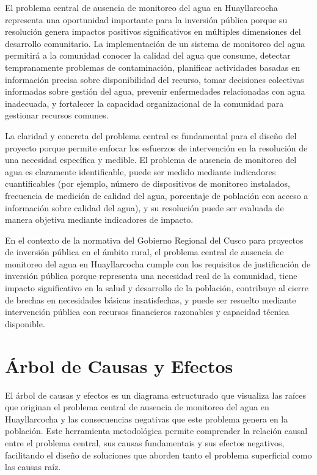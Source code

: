 El problema central de ausencia de monitoreo del agua en Huayllarcocha representa una oportunidad importante para la inversión pública porque su resolución genera impactos positivos significativos en múltiples dimensiones del desarrollo comunitario. La implementación de un sistema de monitoreo del agua permitirá a la comunidad conocer la calidad del agua que consume, detectar tempranamente problemas de contaminación, planificar actividades basadas en información precisa sobre disponibilidad del recurso, tomar decisiones colectivas informadas sobre gestión del agua, prevenir enfermedades relacionadas con agua inadecuada, y fortalecer la capacidad organizacional de la comunidad para gestionar recursos comunes.

La claridad y concreta del problema central es fundamental para el diseño del proyecto porque permite enfocar los esfuerzos de intervención en la resolución de una necesidad específica y medible. El problema de ausencia de monitoreo del agua es claramente identificable, puede ser medido mediante indicadores cuantificables (por ejemplo, número de dispositivos de monitoreo instalados, frecuencia de medición de calidad del agua, porcentaje de población con acceso a información sobre calidad del agua), y su resolución puede ser evaluada de manera objetiva mediante indicadores de impacto.

En el contexto de la normativa del Gobierno Regional del Cusco para proyectos de inversión pública en el ámbito rural, el problema central de ausencia de monitoreo del agua en Huayllarcocha cumple con los requisitos de justificación de inversión pública porque representa una necesidad real de la comunidad, tiene impacto significativo en la salud y desarrollo de la población, contribuye al cierre de brechas en necesidades básicas insatisfechas, y puede ser resuelto mediante intervención pública con recursos financieros razonables y capacidad técnica disponible.


\section{Árbol de Causas y Efectos}

El árbol de causas y efectos es un diagrama estructurado que visualiza las raíces que originan el problema central de ausencia de monitoreo del agua en Huayllarcocha y las consecuencias negativas que este problema genera en la población. Este herramienta metodológica permite comprender la relación causal entre el problema central, sus causas fundamentais y sus efectos negativos, facilitando el diseño de soluciones que aborden tanto el problema superficial como las causas raíz.

